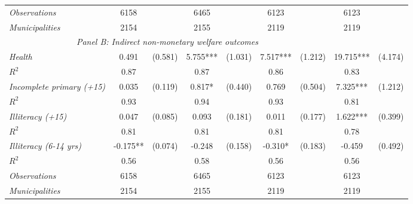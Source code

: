 \begin{tabular}{lcccccccc}
\hline		

\textit{Observations}                 &   6158    &   & 6465    &  &  6123   &  & 6123   &		\\
\textit{Municipalities}               &   2154   &   & 2155   &  &  2119  &  & 2119  &		\\
\hline		
\hline		


\multicolumn{7}{c}{\textit{Panel B: Indirect non-monetary welfare outcomes}} \\
		
\textit{Health}          &  0.491    & (0.581)      &   5.755***        &  (1.031)      &     7.517***  &    (1.212) &     19.715***  &    (4.174)   \\
$R^{2}$			           	   &  0.87   & 	   &     0.87   	&		 &     0.86   & &     0.83   &  \\

\textit{Incomplete primary (+15)}          &  0.035    & (0.119)      &   0.817*        &  (0.440)      &     0.769  &    (0.504)  &     7.325***  &    (1.212) \\
$R^{2}$			           	   &  0.93   & 	   &     0.94   	&		 &     0.93   & &     0.81   &  \\
		
\textit{Illiteracy (+15)}          &  0.047    & (0.085)      &   0.093        &  (0.181)      &     0.011  &    (0.177)  &     1.622***  &    (0.399) \\
$R^{2}$			           	   &  0.81   & 	   &     0.81   	&		 &     0.81   & &     0.78   &  \\

\textit{Illiteracy (6-14 yrs)}          &  -0.175**    & (0.074)      &   -0.248        &  (0.158)      &     -0.310*  &    (0.183)  &     -0.459  &    (0.492) \\
$R^{2}$			           	   &  0.56   & 	   &     0.58   	&		 &     0.56   & &     0.56   &  \\


\hline


\textit{Observations}                 &   6158    &  & 6465    &  &  6123   &  & 6123   &		\\
\textit{Municipalities}               &   2154   &  & 2155   &  &  2119  &  & 2119  &		\\


\end{tabular}%
